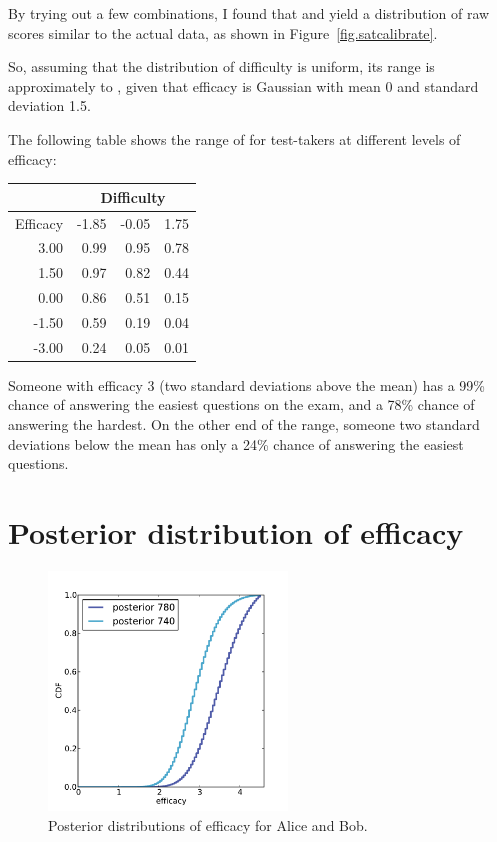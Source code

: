 \documentclass[12pt]{book}
\theoremstyle{exercise}
\begin{document}
By trying out a few combinations, I found that
 and  yield a distribution
of raw scores similar to the actual data, as shown in
Figure~\ref{fig.satcalibrate}.

So, assuming that the distribution of difficulty is uniform,
its range is approximately
 to , given that
efficacy is Gaussian with mean 0 and standard deviation 1.5.

The following table shows the range of  for
test-takers at different levels of efficacy:

\begin{tabular}{|r|r|r|r|}
\hline
           & \multicolumn{3}{|c|}{Difficulty} \\
\hline
Efficacy   & -1.85   &   -0.05   &      1.75  \\
\hline
3.00 &  0.99 &  0.95 &  0.78   \\
1.50 &  0.97 &  0.82 &  0.44   \\
0.00 &  0.86 &  0.51 &  0.15   \\
-1.50 &  0.59 &  0.19 &  0.04   \\
-3.00 &  0.24 &  0.05 &  0.01   \\
\hline
\end{tabular}

Someone with efficacy 3 (two standard deviations above
the mean) has a 99\% chance of answering the easiest questions on
the exam, and a 78\% chance of answering the hardest.  On the other
end of the range, someone two standard deviations below the mean
has only a 24\% chance of answering the easiest questions.


\section{Posterior distribution of efficacy}

\begin{figure}
\centerline{\includegraphics[height=2.5in]{figs/sat_posteriors_eff.pdf}}
\caption{Posterior distributions of efficacy for Alice and Bob.}
\label{fig.satposterior2}
\end{figure}
\end{document}
